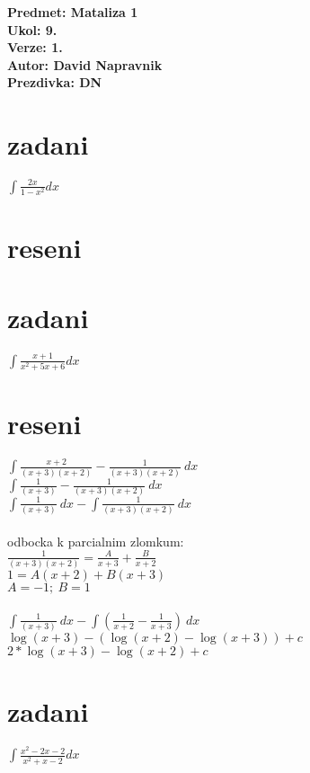\documentclass[a4paper]{article}
\def\doubleunderline#1{\underline{\underline{#1}}}
\begin{document}
\noindent
\textbf{Predmet: Mataliza 1}\\
\textbf{Ukol: 9.}\\
\textbf{Verze: 1.}\\
\textbf{Autor: David Napravnik}\\
\textbf{Prezdivka: DN}


\section*{zadani}
$\int \frac{2x}{1-x^2} dx$

\section*{reseni}









\section*{zadani}
$\int \frac{x+1}{x^2+5x+6} dx$

\section*{reseni}
$\int \frac{x+2}{(x+3)(x+2)} - \frac{1}{(x+3)(x+2)}~dx$\\
$\int \frac{1}{(x+3)} - \frac{1}{(x+3)(x+2)}~dx$\\
$\int \frac{1}{(x+3)}~dx - \int \frac{1}{(x+3)(x+2)}~dx$\\
\\
odbocka k parcialnim zlomkum:\\
$\frac{1}{(x+3)(x+2)}=\frac{A}{x+3}+\frac{B}{x+2}$\\
$1=A(x+2)+B(x+3)$\\
$A=-1;~B=1$\\
\\
$\int \frac{1}{(x+3)}~dx - \int\left( \frac{1}{x+2}-\frac{1}{x+3}\right)~dx$\\
$\log(x+3) - (\log(x+2)-\log(x+3)) + c$\\
\doubleunderline{$2*\log(x+3) - \log(x+2) + c$}\\








\section*{zadani}
$\int \frac{x^2-2x-2}{x^2+x-2} dx$
\end{document}
